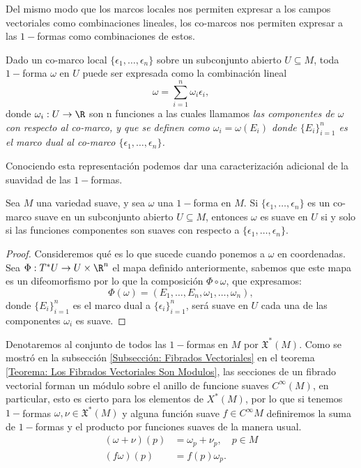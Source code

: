 Del mismo modo que los marcos locales nos permiten expresar a los campos vectoriales como combinaciones lineales, los co-marcos nos permiten expresar a las $1-$formas como combinaciones de estos.

Dado un co-marco local $\{\epsilon_1,\ldots,\epsilon_n\}$ sobre un subconjunto abierto $U \subseteq M$, toda $1-$forma $\omega$ en $U$ puede ser expresada como la combinación lineal
\[
	\omega = \sum_{i=1}^{n} \omega_i \epsilon_i,
\]
donde $\omega_i: U \to \R$ son n funciones a las cuales llamamos \it{las componentes de $\omega$ con respecto al co-marco}, y que se definen como $\omega_i = \omega(E_i)$ donde $\{E_i\}_{i=1}^n$ es el marco dual al co-marco $\{\epsilon_1,\ldots,\epsilon_n\}$.

Conociendo esta representación podemos dar una caracterización adicional de la suavidad de las $1-$formas.

\begin{theorem}
	Sea $M$ una variedad suave, y sea $\omega$ una $1-$forma en $M$. Si $\{\epsilon_1,\ldots,\epsilon_n\}$ es un co-marco suave en un subconjunto abierto $U \subseteq M$, entonces $\omega$ es suave en $U$ si y solo si las funciones componentes son suaves con respecto a $\{\epsilon_1, \ldots, \epsilon_n\}$.
\end{theorem}

\begin{proof}
	Consideremos qué es lo que sucede cuando ponemos a $\omega$ en coordenadas. Sea $\Phi: T^{*}U \to U \times \R^n$ el mapa definido anteriormente, sabemos que este mapa es un difeomorfismo por lo que la composición $\Phi \circ \omega$, que expresamos:
	\[
		\Phi(\omega) = (E_1, \ldots, E_n, \omega_1, \ldots, \omega_n),
	\]
	donde $\{E_i\}_{i=1}^n$ es el marco dual a $\{\epsilon_i\}_{i=1}^n$, será suave en $U$ cada una de las componentes $\omega_i$ es suave.
\end{proof}

Denotaremos al conjunto de todos las $1-$formas en $M$ por $\mathfrak{X}^*(M)$. Como se mostró en la subsección \ref{Subsección: Fibrados Vectoriales} en el teorema \ref{Teorema: Los Fibrados Vectoriales Son Modulos}, las secciones de un fibrado vectorial forman un módulo sobre el anillo de funcione suaves $C^{\infty}(M)$, en particular, esto es cierto para los elementos de $X^{*}(M)$, por lo que si tenemos $1-$formas $\omega,\nu \in \mathfrak{X}^*(M)$ y alguna función suave $f \in C^{\infty}M$ definiremos la suma de $1-$formas y el producto por funciones suaves de la manera usual.
\begin{align*}
	(\omega + \nu)(p) & = \omega_p + \nu_p, \quad p \in M \\
	(f\omega)(p)      & = f(p)\omega_p.
\end{align*}
